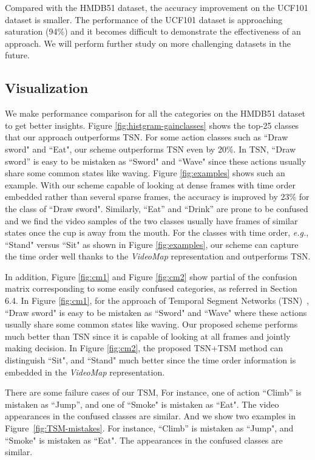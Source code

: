\documentclass[english, 10pt, twocolumn, twoside]{IEEEtran}
\begin{document}
Compared with the HMDB51 dataset, the accuracy improvement on the UCF101 dataset is smaller. The performance of the UCF101 dataset is approaching saturation (94\%) and it becomes difficult to demonstrate the effectiveness of an approach. We will perform further study on more challenging datasets in the future.

\subsection{Visualization}

We make performance comparison for all the categories on the HMDB51 dataset to get better insights. Figure \ref{fig:histgram-gainclasses} shows the top-25 classes that our approach outperforms TSN. For some action classes such as ``Draw sword" and ``Eat", our scheme outperforms TSN even by 20\%.
In TSN, ``Draw sword'' is easy to be mistaken as ``Sword" and ``Wave" since these actions usually share some common states like  waving. Figure \ref{fig:examples} shows such an example. With our scheme capable of looking at dense frames with time order embedded rather than several sparse frames, the accuracy is improved by 23\% for the class of ``Draw sword". Similarly, ``Eat'' and ``Drink'' are prone to be confused and we find the video samples of the two classes usually have frames of similar states once the cup is away from the mouth. For the classes with time order, \emph{e.g.}, ``Stand" versus ``Sit" as shown in Figure \ref{fig:examples}, our scheme can capture the time order well thanks to the \emph{VideoMap} representation and outperforms TSN.

In addition, Figure \ref{fig:cm1} and Figure \ref{fig:cm2} show partial of the confusion matrix corresponding to some easily confused categories, as referred in Section 6.4. In Figure \ref{fig:cm1}, for the approach of Temporal Segment Networks (TSN)~\cite{wang2016temporal}, ``Draw sword" is easy to be mistaken as ``Sword" and ``Wave" where these actions usually share some common states like waving. Our proposed scheme performs much better than TSN since it is capable of looking at all frames and jointly making decision. In Figure \ref{fig:cm2}, the proposed TSN+TSM method can distinguish ``Sit", and ``Stand" much better since the time order information is embedded in the \emph{VideoMap} representation.

There are some failure cases of our TSM, For instance, one of action ``Climb'' is mistaken as ``Jump'', and one of ``Smoke" is mistaken as ``Eat". The video appearances in the confused classes are similar. And we show two examples in Figure~\ref{fig:TSM-mistakes}. For instance, ``Climb'' is mistaken as ``Jump", and ``Smoke" is mistaken as ``Eat". The appearances in the confused classes are similar.
\end{document}
